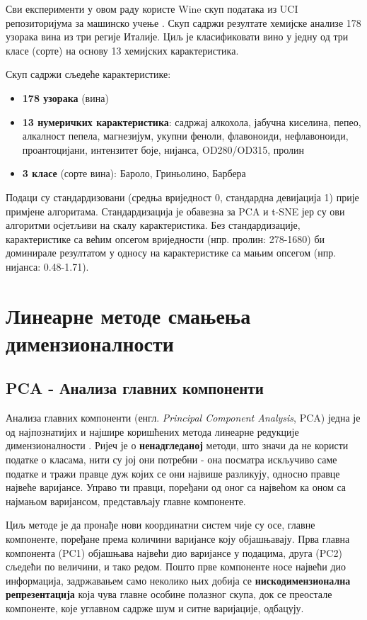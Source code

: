 \documentclass{article}
\begin{document}
	Сви експерименти у овом раду користе Wine скуп података из UCI репозиторијума за машинско учење \cite{wine_dataset}. Скуп садржи резултате хемијске анализе 178 узорака вина из три регије Италије. Циљ је класификовати вино у једну од три класе (сорте) на основу 13 хемијских карактеристика.
	
	Скуп садржи сљедеће карактеристике:
	\begin{itemize}
		\item \textbf{178 узорака} (вина)
		\item \textbf{13 нумеричких карактеристика}: садржај алкохола, јабучна киселина, пепео, алкалност пепела, магнезијум, укупни феноли, флавоноиди, нефлавоноиди, проантоцијани, интензитет боје, нијанса, OD280/OD315, пролин
		\item \textbf{3 класе} (сорте вина): Бароло, Гриньолино, Барбера
	\end{itemize}
	
	Подаци су стандардизовани (средња вриједност 0, стандардна девијација 1) прије примјене алгоритама. Стандардизација је обавезна за PCA и t-SNE јер су ови алгоритми осјетљиви на скалу карактеристика. Без стандардизације, карактеристике са већим опсегом вриједности (нпр. пролин: 278-1680) би доминирале резултатом у односу на карактеристике са мањим опсегом (нпр. нијанса: 0.48-1.71).
	
	\newpage
		
	
	\section{Линеарне методе смањења димензионалности}
	
	
	\subsection{PCA - Анализа главних компоненти}
	
	Анализа главних компоненти (енгл. \textit{Principal Component Analysis}, PCA) једна је од најпознатијих и најшире коришћених метода линеарне редукције димензионалности \cite{bishop2006, shlens2014}. Ријеч је о \textbf{ненадгледаној} методи, што значи да не користи податке о класама, нити су јој они потребни - она посматра искључиво саме податке и тражи правце дуж којих се они највише разликују, односно правце највеће варијансе. Управо ти правци, поређани од оног са највећом ка оном са најмањом варијансом, представљају главне компоненте.
	
	Циљ методе је да пронађе нови координатни систем чије су осе, главне компоненте, поређане према количини варијансе коју објашњавају. Прва главна компонента (PC1) објашњава највећи дио варијансе у подацима, друга (PC2) сљедећи по величини, и тако редом. Пошто прве компоненте носе највећи дио информација, задржавањем само неколико њих добија се \textbf{нискодимензионална репрезентација} која чува главне особине полазног скупа, док се преостале компоненте, које углавном садрже шум и ситне варијације, одбацују.
	
\end{document}
